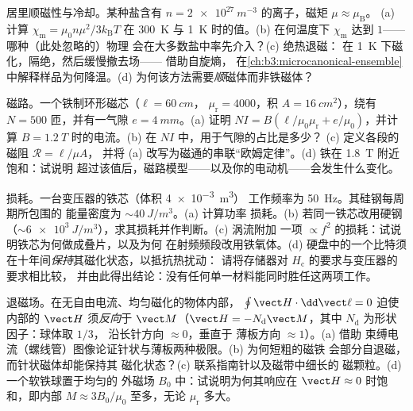 \begin{exercise}[$\star\star$]\label{exo:b3:electromagnetism-in-matter:9}
居里顺磁性与冷却。某种盐含有 $n =
\qty{2e27}{m^{-3}}$ 的离子，磁矩 $\mu \approx \mu_{\text{B}}$。
(a) 计算 $\chi_{\text{m}} = \mu_0n\mu^2/3k_{\text{B}}T$ 在
\qty{300}{K} 与 \qty{1}{K} 时的值。(b) 在何温度下
$\chi_{\text{m}}$ 达到 $1$——哪种（此处忽略的）物理
会在大多数盐中率先介入？(c) 绝热退磁：
在 \qty{1}{K} 下磁化，隔绝，然后缓慢撤去场——
借助自旋熵，
在\cref{ch:b3:microcanonical-ensemble}中解释样品为何降温。(d)
为何该方法需要\emph{顺}磁体而非铁磁体？
\end{exercise}

\begin{exercise}[$\star\star\star$]\label{exo:b3:electromagnetism-in-matter:10}
磁路。一个铁制环形磁芯（$\ell = \qty{60}{cm}$，
$\mu_{\text{r}} = 4000$，积 $A = \qty{16}{cm^2}$），绕有
$N = 500$ 匝，并有一气隙 $e = \qty{4}{mm}$。(a) 证明 $NI =
B(\ell/\mu_0\mu_{\text{r}} + e/\mu_0)$，并计算
$B = \qty{1.2}{T}$ 时的电流。(b) 在 $NI$ 中，用于气隙的占比是多少？
(c) 定义各段的磁阻 $\mathcal R = \ell/\mu A$，
并将 (a) 改写为磁通的串联“欧姆定律”。(d)
铁在 \qty{1.8}{T} 附近饱和：试说明
超过该值后，磁路模型——以及你的电动机——会发生什么变化。
\end{exercise}

\begin{exercise}[$\star\star\star$]\label{exo:b3:electromagnetism-in-matter:11}
损耗。一台变压器的铁芯（体积 \qty{4e-3}{m^3}）
工作频率为 \qty{50}{Hz}。其硅钢每周期所包围的
能量密度为 $\sim\qty{40}{J/m^3}$。(a) 计算功率
损耗。(b) 若同一铁芯改用硬钢
（$\sim\qty{6e3}{J/m^3}$），求其损耗并作判断。(c) 涡流附加
一项 $\propto f^2$ 的损耗：试说明铁芯为何做成叠片，以及为何
在射频频段改用铁氧体。(d) 硬盘中的一个比特须
在十年间\emph{保持}其磁化状态，以抵抗热扰动：
请将存储器对 $H_{\text{c}}$ 的要求与变压器的要求相比较，
并由此得出结论：没有任何单一材料能同时胜任这两项工作。
\end{exercise}

\begin{exercise}[$\star\star\star$]\label{exo:b3:electromagnetism-in-matter:12}
退磁场。在无自由电流、均匀磁化的物体内部，
$\oint\vect H\cdot\dd\vect\ell = 0$ 迫使
内部的 $\vect H$ 须\emph{反向}于 $\vect M$（$\vect H =
-N_{\text{d}}\vect M$，其中 $N_{\text{d}}$ 为形状因子：球体取 $1/3$，
沿长针方向 $\approx 0$，垂直于
薄板方向 $\approx 1$）。(a) 借助
束缚电流（螺线管）图像论证针状与薄板两种极限。(b) 为何短粗的磁铁
会部分自退磁，而针状磁体却能保持其
磁化状态？(c) 联系指南针以及磁带中细长的
磁颗粒。(d) 一个软铁球置于均匀的
外磁场 $B_0$ 中：试说明为何其响应在 $\vect H
\approx 0$ 时饱和，即内部 $M \approx 3B_0/\mu_0$ 至多，无论
$\mu_{\text{r}}$ 多大。
\end{exercise}

